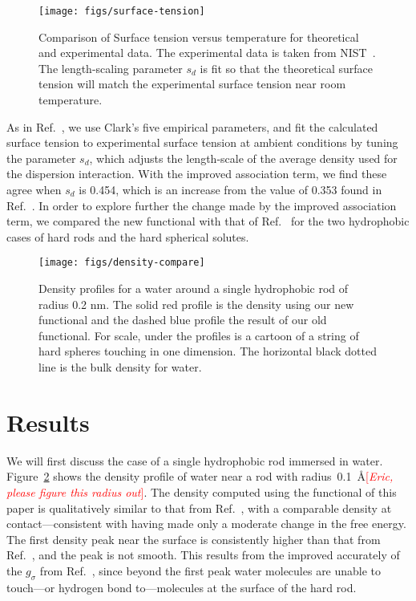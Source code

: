 \documentclass[twocolumn,amsmath,amssymb,prl]{revtex4-1}
\newcommand\lscale{\ensuremath{s_d}}
\newcommand{\fixme}[1]{\textcolor{red}{[\emph{#1}]}}
\begin{document}
\begin{figure}
\begin{center}
\texttt{[image: figs/surface-tension]}
\end{center}
\caption{Comparison of Surface tension versus temperature for
  theoretical and experimental data. The experimental data is taken
  from NIST~\cite{nistwater}.  The length-scaling parameter $\lscale$
  is fit so that the theoretical surface tension will match the
  experimental surface tension near room temperature.}
\label{fig:surface-tension}
\end{figure}

As in Ref.~, we use Clark's five
empirical parameters, and fit the calculated surface tension to
experimental surface tension at ambient conditions by tuning the
parameter $\lscale$, which adjusts the length-scale of the average
density used for the dispersion interaction.  With the improved
association term, we find these agree when $\lscale$ is 0.454, which
is an increase from the value of 0.353 found in
Ref.~.  In order to explore further the
change made by the improved association term, we compared the new
functional with that of Ref.~ for the two
hydrophobic cases of hard rods and the hard spherical solutes.

\begin{figure}
\begin{center}
\texttt{[image: figs/density-compare]}
\end{center}
\caption{ Density profiles for a water around a single hydrophobic
  rod of radius 0.2 nm. The solid red profile is the density using our new functional
  and the dashed blue profile the result of our old functional.  For
  scale, under the profiles is a cartoon of a string of hard
  spheres touching in one dimension. The horizontal black dotted line
  is the bulk density for water.}
\label{fig:density-single-rod}
\end{figure}

\section{Results}

We will first discuss the case of a single hydrophobic rod immersed in
water. Figure~\ref{fig:density-single-rod} shows the density profile
of water near a rod with radius~0.1~\AA\fixme{Eric, please figure this
  radius out}.  The density computed using the functional of this
paper is qualitatively similar to that from
Ref.~, with a comparable density at
contact---consistent with having made only a moderate change in the
free energy.  The first density peak near the surface is consistently
higher than that from Ref.~, and the peak
is not smooth.  This results from the improved accurately of the
$g_\sigma$ from Ref.~, since beyond the
first peak water molecules are unable to touch---or hydrogen bond
to---molecules at the surface of the hard rod.
\end{document}

